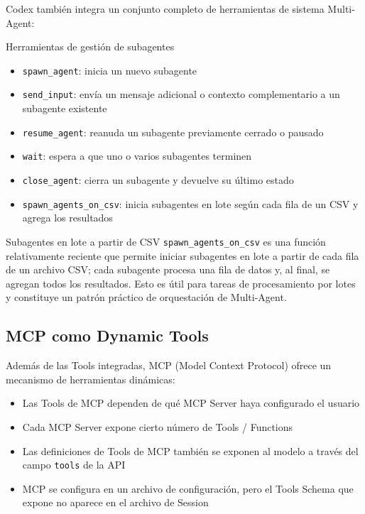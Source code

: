\documentclass[a4paper]{article}
\begin{document}
Codex también integra un conjunto completo de herramientas de sistema Multi-Agent:

\begin{importantbox}{Herramientas de gestión de subagentes}
\begin{itemize}
    \item \texttt{spawn\_agent}: inicia un nuevo subagente
    \item \texttt{send\_input}: envía un mensaje adicional o contexto complementario a un subagente existente
    \item \texttt{resume\_agent}: reanuda un subagente previamente cerrado o pausado
    \item \texttt{wait}: espera a que uno o varios subagentes terminen
    \item \texttt{close\_agent}: cierra un subagente y devuelve su último estado
    \item \texttt{spawn\_agents\_on\_csv}: inicia subagentes en lote según cada fila de un CSV y agrega los resultados
\end{itemize}
\end{importantbox}

\begin{knowledgebox}{Subagentes en lote a partir de CSV}
\texttt{spawn\_agents\_on\_csv} es una función relativamente reciente que permite iniciar subagentes en lote a partir de cada fila de un archivo CSV; cada subagente procesa una fila de datos y, al final, se agregan todos los resultados. Esto es útil para tareas de procesamiento por lotes y constituye un patrón práctico de orquestación de Multi-Agent.
\end{knowledgebox}

\subsection{MCP como Dynamic Tools}

Además de las Tools integradas, MCP (Model Context Protocol) ofrece un mecanismo de herramientas dinámicas:

\begin{itemize}
    \item Las Tools de MCP dependen de qué MCP Server haya configurado el usuario
    \item Cada MCP Server expone cierto número de Tools / Functions
    \item Las definiciones de Tools de MCP también se exponen al modelo a través del campo \texttt{tools} de la API
    \item MCP se configura en un archivo de configuración, pero el Tools Schema que expone no aparece en el archivo de Session
\end{itemize}
\end{document}
